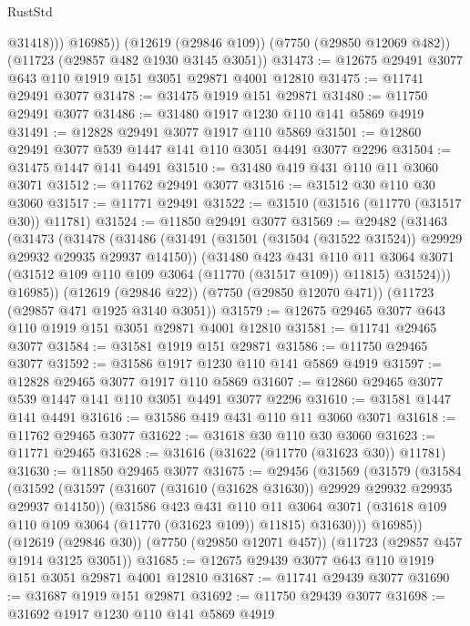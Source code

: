 \begin{lexlean}{RustStd}
\begin{coremodule}
              @31418)))
        @16985))
    (@12619 (@29846 @109))
    (@7750 (@29850 @12069 @482))
    (@11723 (@29857 @482 @1930 @3145 @3051))
@31473 := @12675 @29491 @3077 @643 @110 @1919 @151 @3051 @29871 @4001 @12810
@31475 := @11741 @29491 @3077
@31478 := @31475 @1919 @151 @29871
@31480 := @11750 @29491 @3077
@31486 := @31480 @1917 @1230 @110 @141 @5869 @4919
@31491 := @12828 @29491 @3077 @1917 @110 @5869
@31501 := @12860 @29491 @3077 @539 @1447 @141 @110 @3051 @4491 @3077 @2296
@31504 := @31475 @1447 @141 @4491
@31510 := @31480 @419 @431 @110 @11 @3060 @3071
@31512 := @11762 @29491 @3077
@31516 := @31512 @30 @110 @30 @3060
@31517 := @11771 @29491
@31522 := @31510 (@31516 (@11770 (@31517 @30)) @11781)
@31524 := @11850 @29491 @3077
@31569 := @29482
    (@31463
      (@31473
        (@31478
          (@31486
            (@31491 (@31501 (@31504 (@31522 @31524)) @29929 @29932 @29935 @29937 @14150))
            (@31480
              @423
              @431
              @110
              @11
              @3064
              @3071
              (@31512 @109 @110 @109 @3064 (@11770 (@31517 @109)) @11815)
              @31524)))
        @16985))
    (@12619 (@29846 @22))
    (@7750 (@29850 @12070 @471))
    (@11723 (@29857 @471 @1925 @3140 @3051))
@31579 := @12675 @29465 @3077 @643 @110 @1919 @151 @3051 @29871 @4001 @12810
@31581 := @11741 @29465 @3077
@31584 := @31581 @1919 @151 @29871
@31586 := @11750 @29465 @3077
@31592 := @31586 @1917 @1230 @110 @141 @5869 @4919
@31597 := @12828 @29465 @3077 @1917 @110 @5869
@31607 := @12860 @29465 @3077 @539 @1447 @141 @110 @3051 @4491 @3077 @2296
@31610 := @31581 @1447 @141 @4491
@31616 := @31586 @419 @431 @110 @11 @3060 @3071
@31618 := @11762 @29465 @3077
@31622 := @31618 @30 @110 @30 @3060
@31623 := @11771 @29465
@31628 := @31616 (@31622 (@11770 (@31623 @30)) @11781)
@31630 := @11850 @29465 @3077
@31675 := @29456
    (@31569
      (@31579
        (@31584
          (@31592
            (@31597 (@31607 (@31610 (@31628 @31630)) @29929 @29932 @29935 @29937 @14150))
            (@31586
              @423
              @431
              @110
              @11
              @3064
              @3071
              (@31618 @109 @110 @109 @3064 (@11770 (@31623 @109)) @11815)
              @31630)))
        @16985))
    (@12619 (@29846 @30))
    (@7750 (@29850 @12071 @457))
    (@11723 (@29857 @457 @1914 @3125 @3051))
@31685 := @12675 @29439 @3077 @643 @110 @1919 @151 @3051 @29871 @4001 @12810
@31687 := @11741 @29439 @3077
@31690 := @31687 @1919 @151 @29871
@31692 := @11750 @29439 @3077
@31698 := @31692 @1917 @1230 @110 @141 @5869 @4919

\end{coremodule}
\end{lexlean}
